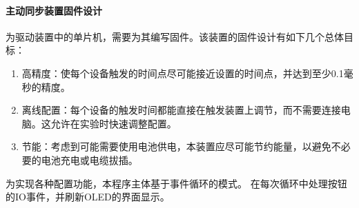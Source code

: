 \paragraph{主动同步装置固件设计}
为驱动装置中的单片机，需要为其编写固件。该装置的固件设计有如下几个总体目标：
\begin{enumerate}
\item 高精度：使每个设备触发的时间点尽可能接近设置的时间点，并达到至少0.1毫秒的精度。
\item 离线配置：每个设备的触发时间都能直接在触发装置上调节，而不需要连接电脑。这允许在实验时快速调整配置。
\item 节能：考虑到可能需要使用电池供电，本装置应尽可能节约能量，以避免不必要的电池充电或电缆拔插。
\end{enumerate}

为实现各种配置功能，本程序主体基于事件循环的模式。
在每次循环中处理按钮的IO事件，并刷新OLED的界面显示。
